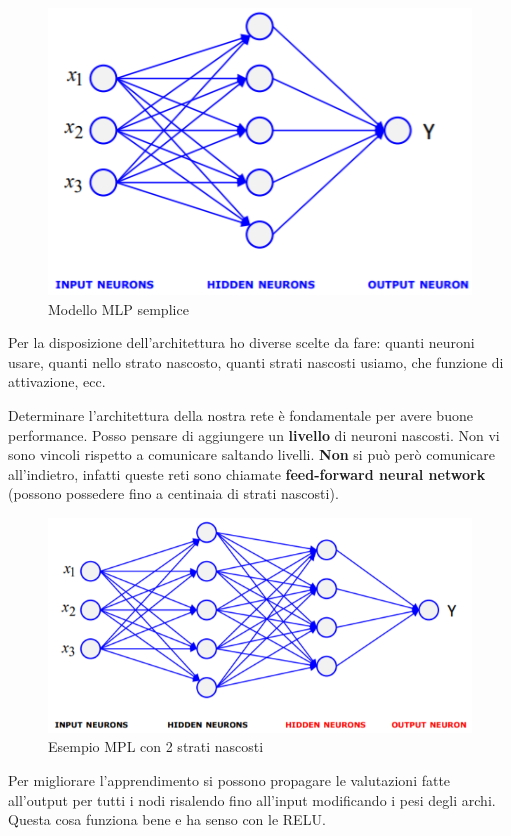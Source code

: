\begin{figure}[H]
	\centering
	\includegraphics[height=0.5 \linewidth]{classification/pict/mlp_struct.png}
	\caption{Modello MLP semplice}
\end{figure}

Per la disposizione dell'architettura ho diverse scelte da fare: quanti neuroni usare, quanti nello strato nascosto, quanti strati nascosti usiamo, che funzione di attivazione, ecc.

Determinare l'architettura della nostra rete è fondamentale per avere buone performance. Posso pensare di aggiungere un \textbf{livello} di neuroni nascosti. Non vi sono vincoli rispetto a comunicare saltando livelli. \textbf{Non} si può però comunicare all'indietro, infatti queste reti sono chiamate \textbf{feed-forward neural network} (possono possedere fino a centinaia di strati nascosti).

\begin{figure}[H]
	\centering
	\includegraphics[height=0.5 \linewidth]{classification/pict/mlp_esempio.png}
	\caption{Esempio MPL con 2 strati nascosti}
\end{figure}

Per migliorare l'apprendimento si possono propagare le valutazioni fatte all'output per tutti i nodi risalendo fino all'input modificando i pesi degli archi. Questa cosa funziona bene e ha senso con le RELU.

